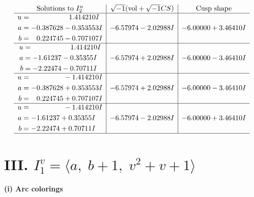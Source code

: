 \documentclass[1p]{elsarticle_modified}
\theoremstyle{definition}
\newcommand{\I}{\sqrt{-1}}
\begin{document}
$$\begin{array}{c|c|c}  
\text{Solutions to }I^u_{2}& \I (\text{vol} + \sqrt{-1}CS) & \text{Cusp shape}\\
 \hline 
\begin{aligned}
u &= \phantom{-0.000000 -}1.414210 I \\
a &= -0.387628 - 0.353553 I \\
b &= \phantom{-}0.224745 - 0.707107 I\end{aligned}
 & -6.57974 - 2.02988 I & -6.00000 + 3.46410 I \\ \hline\begin{aligned}
u &= \phantom{-0.000000 -}1.414210 I \\
a &= -1.61237 - 0.35355 I \\
b &= -2.22474 - 0.70711 I\end{aligned}
 & -6.57974 + 2.02988 I & -6.00000 - 3.46410 I \\ \hline\begin{aligned}
u &= \phantom{-0.000000 } -1.414210 I \\
a &= -0.387628 + 0.353553 I \\
b &= \phantom{-}0.224745 + 0.707107 I\end{aligned}
 & -6.57974 + 2.02988 I & -6.00000 - 3.46410 I \\ \hline\begin{aligned}
u &= \phantom{-0.000000 } -1.414210 I \\
a &= -1.61237 + 0.35355 I \\
b &= -2.22474 + 0.70711 I\end{aligned}
 & -6.57974 - 2.02988 I & -6.00000 + 3.46410 I\\
 \hline 
 \end{array}$$\newpage\newpage\renewcommand{\arraystretch}{1}
\centering \section*{III. $I^v_{1}= \langle a,\;b+1,\;v^2+v+1 \rangle$}
\flushleft \textbf{(i) Arc colorings}\\
\end{document}
